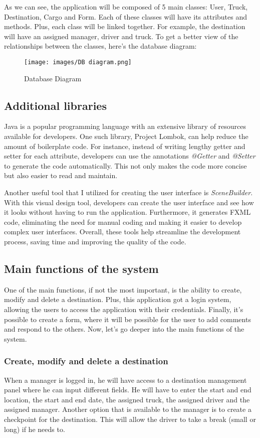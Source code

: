 \documentclass{article}
\begin{document}
As we can see, the application will be composed of 5 main classes: User, Truck, Destination, 
Cargo and Form. Each of these classes will have its attributes and methods. Plus, each
class will be linked together. For example, the destination will have an assigned manager, driver
and truck. To get a better view of the relationships between the classes, here's the database diagram:

\begin{figure}[h]
    \centering
    \texttt{[image: images/DB diagram.png]}
    \caption{Database Diagram}
\end{figure}

\newpage

\subsection{Additional libraries}
Java is a popular programming language with an extensive library of resources available for 
developers. One such library, Project Lombok, can help reduce the amount of boilerplate code. 
For instance, instead of writing lengthy getter and setter for each attribute, developers can
use the annotations \textit{@Getter} and \textit{@Setter} to generate the code automatically. 
This not only makes the code more concise but also easier to read and maintain.

Another useful tool that I utilized for creating the user interface is \textit{SceneBuilder}. 
With this visual design tool, developers can create the user interface and see how it looks
without having to run the application. Furthermore, it generates FXML code, eliminating the
need for manual coding and making it easier to develop complex user interfaces. 
Overall, these tools help streamline the development process, saving time and improving 
the quality of the code.


\subsection{Main functions of the system}
One of the main functions, if not the most important, is the ability to create, modify
and delete a destination. Plus, this application got a login system, allowing the users
to access the application with their credentials. Finally, it's possible to create
a form, where it will be possible for the user to add comments and respond to the others.
Now, let's go deeper into the main functions of the system.

\subsubsection{Create, modify and delete a destination}
When a manager is logged in, he will have access to a destination management panel where
he can input different fields. He will have to enter the start and end location, the start and 
end date, the assigned truck, the assigned driver and the assigned manager. Another option 
that is available to the manager is to create a checkpoint for the destination. This will 
allow the driver to take a break (small or long) if he needs to. 
\end{document}
